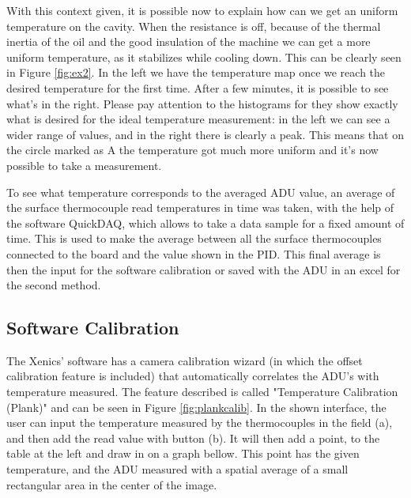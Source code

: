 \par With this context given, it is possible now to explain how can we get an uniform temperature on the cavity. When the resistance is off, because of the thermal inertia of the oil and the good insulation of the machine we can get a more uniform temperature, as it stabilizes while cooling down. This can be clearly seen in Figure \ref{fig:ex2}. In the left we have the temperature map once we reach the desired temperature for the first time. After a few minutes, it is possible to see what's in the right. Please pay attention to the histograms for they show exactly what is desired for the ideal temperature measurement: in the left we can see a wider range of values, and in the right there is clearly a peak. This means that on the circle marked as A the temperature got much more uniform and it's now possible to take a measurement. \\

\par To see what temperature corresponds to the averaged ADU value, an average of the surface thermocouple read temperatures in time was taken, with the help of the software QuickDAQ, which allows to take a data sample for a fixed amount of time. This is used to make the average between all the surface thermocouples connected to the board and the value shown in the PID. This final average is then the input for the software calibration or saved with the ADU in an excel for the second method. \\

\subsection{Software Calibration}

\par The Xenics' software has a camera calibration wizard (in which the offset calibration feature is included) that automatically correlates the ADU's with temperature measured. The feature described is called "Temperature Calibration (Plank)" and can be seen in Figure \ref{fig:plankcalib}. In the shown interface, the user can input the temperature measured by the thermocouples in the field (a), and then add the read value with button (b). It will then add a point, to the table at the left and draw in on a graph bellow. This point has the given temperature, and the ADU measured with a spatial average of a small rectangular area in the center of the image. \\

